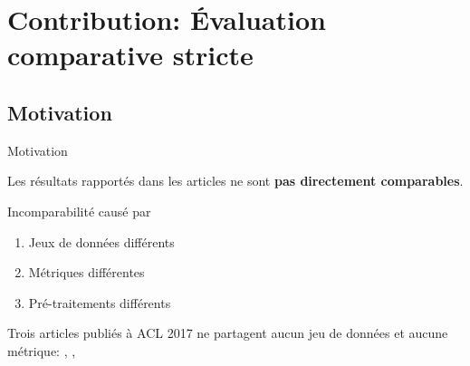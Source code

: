 \section{Contribution: Évaluation comparative stricte}

\subsection{Motivation}

\begin{frame}{Motivation}

    Les résultats rapportés dans les articles ne sont \textbf{pas directement comparables}.
    
    
    \begin{block}{Incomparabilité causé par}
    \begin{enumerate}
        \item Jeux de données différents
        \item Métriques différentes
        \item Pré-traitements différents
    \end{enumerate}
    \end{block}
    
    
    Trois articles publiés à ACL 2017 ne partagent aucun jeu de données et aucune métrique:
    {\footnotesize
    \cite{meng_deep_2017},%
    \cite{florescu_positionrank:_2017}, %
    \cite{teneva_salience_2017} %
    }
    
\end{frame}

